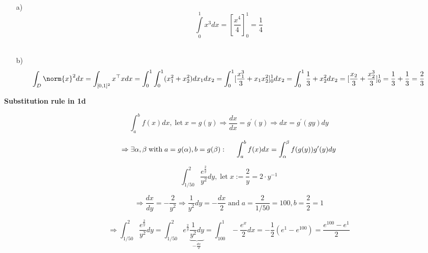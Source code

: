 {
\blank
\small
~ \\[-1.5cm]
\begin{bsp} 
	\begin{itemize}
		\item[a)] \[\int\limits_0^1 x^3 dx = [\frac{x^4}{4}]_0^1 = \frac{1}{4}\]   \\[-0.9cm]
		\item[b)] \[\int_D \norm{x}^2 dx = \int_{[0,1]^2} x^\top x dx = \int_0^1 \int_0^1 (x_1^2 +x_2^2) dx_1 dx_2 = 
	   \int_0^1 [\frac{x_1^3}{3} + x_1 x_2^2]_0^1 dx_2 = \int_0^1 \frac{1}{3} + x_2^2 dx_2 = [\frac{x_2}{3} + \frac{x_2^3}{3}]^1_0 = \frac{1}{3}+\frac{1}{3} = \frac{2}{3}\]
	\end{itemize}
\end{bsp}
\textbf{Substitution rule in 1d} \vspace{-0.5cm}
\begin{itemize}
	\item[] \[ \int_a^b f(x) dx,\; \text{let}\; x = g(y) \Rightarrow \frac{dx}{dx} = g^\prime (y) \Rightarrow dx = g^\prime (gy) dy \]
	\item[] \[ \Rightarrow \exists \alpha,\beta \; \text{with}\; a=g(\alpha), b= g(\beta): \hspace{0.5cm} \int_a^b f(x) dx = \int_\alpha^\beta f(g(y))g^\prime (y) dy \]
\end{itemize}
\begin{bsp}
	\begin{itemize}
		\item[] \[ \int_{1/50}^2 \frac{e^{\frac{2}{y}}}{y^2}dy, \; \text{let}\; x := \frac{2}{y} = 2\cdot y^{-1}\]
		\item[] \[ \Rightarrow \frac{dx}{dy} = - \frac{2}{y^2} \Rightarrow \frac{1}{y^2} dy = - \frac{dx}{2} \; \text{and} \; a = \frac{2}{1/50} = 100, b= \frac{2}{2} = 1\]
		\item[] \[ \Rightarrow \int_{1/50}^2 \frac{e^{\frac{2}{y}}}{y^2}dy = \int_{1/50}^2 e^{\frac{2}{y}} \underbrace{\frac{1}{y^2}dy}_{-\frac{dx}{2}} = \int_100^1 - \frac{e^x}{2}dx = -\frac{1}{2}(e^1 - e^{100}) = \frac{e^{100}-e^1}{2}\]
	\end{itemize}
\end{bsp}
}


